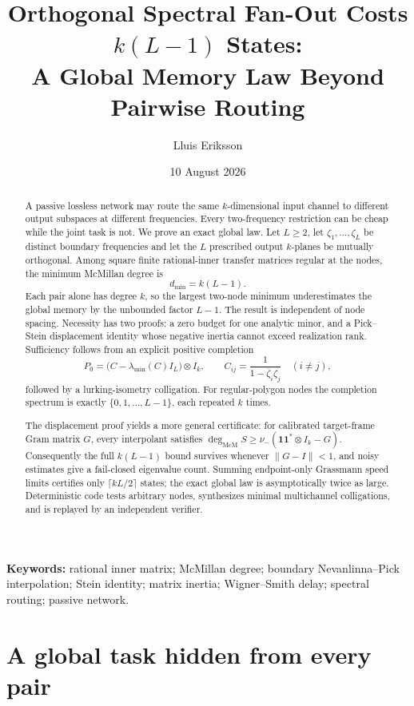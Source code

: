 \documentclass[11pt]{article}
\title{Orthogonal Spectral Fan-Out Costs $k(L-1)$ States:\\
A Global Memory Law Beyond Pairwise Routing}
\author{Lluis Eriksson}
\date{10 August 2026}
\theoremstyle{definition}
\theoremstyle{remark}
\newcommand{\mcdeg}{\deg_{\mathrm{McM}}}
\newcommand{\nminus}{\nu_{-}}
\newcommand{\norm}[1]{\lVert#1\rVert}
\begin{document}
\maketitle

\begin{abstract}
A passive lossless network may route the same $k$-dimensional input channel to
different output subspaces at different frequencies.  Every two-frequency
restriction can be cheap while the joint task is not.  We prove an exact
global law.  Let $L\ge2$, let $\zeta_1,\ldots,\zeta_L$ be distinct boundary frequencies
and let the $L$ prescribed output $k$-planes be mutually orthogonal.  Among
square finite rational-inner transfer matrices regular at the nodes, the
minimum McMillan degree is
\[
                         d_{\min}=k(L-1).
\]
Each pair alone has degree $k$, so the largest two-node minimum underestimates
the global memory by the unbounded factor $L-1$.  The result is independent of
node spacing.  Necessity has two proofs: a zero budget for one analytic
minor, and a Pick--Stein displacement identity whose negative inertia cannot
exceed realization rank.  Sufficiency follows from an explicit positive
completion
\[
 P_0=\bigl(C-\lambda_{\min}(C)I_L\bigr)\otimes I_k,
 \qquad
 C_{ij}=\frac{1}{1-\overline\zeta_i\zeta_j}\quad(i\ne j),
\]
followed by a lurking-isometry colligation.  For regular-polygon nodes the
completion spectrum is exactly $\{0,1,\ldots,L-1\}$, each repeated $k$
times.

The displacement proof yields a more general certificate: for calibrated
target-frame Gram matrix $G$, every interpolant satisfies
$\mcdeg S\ge\nminus(\mathbf1\mathbf1^*\otimes I_k-G)$.  Consequently the
full $k(L-1)$ bound survives whenever $\norm{G-I}<1$, and noisy estimates give
a fail-closed eigenvalue count.  Summing endpoint-only Grassmann speed limits
certifies only $\lceil kL/2\rceil$ states; the exact global law is
asymptotically twice as large.  Deterministic code tests arbitrary nodes, synthesizes minimal
multichannel colligations, and is replayed by an independent verifier.
\end{abstract}

\noindent\textbf{Keywords:} rational inner matrix; McMillan degree;
boundary Nevanlinna--Pick interpolation; Stein identity; matrix inertia;
Wigner--Smith delay; spectral routing; passive network.

\section{A global task hidden from every pair}
\end{document}

